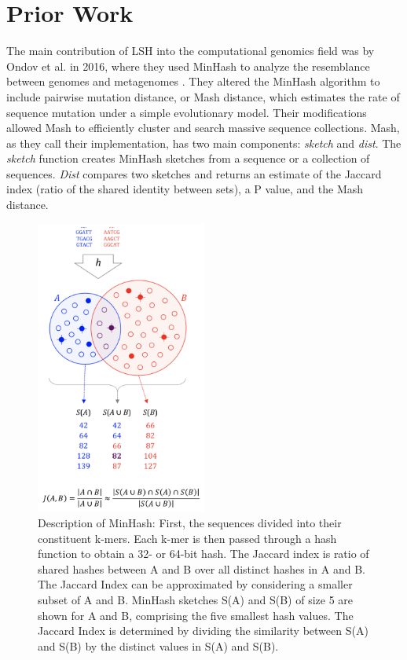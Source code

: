 \documentclass[12pt, letterpaper]{article}
\begin{document}
\section{Prior Work}
The main contribution of LSH into the computational genomics field was by Ondov et al. in 2016, where they used MinHash to analyze the resemblance between genomes and metagenomes \cite{MinHash}. They altered the MinHash algorithm to include pairwise mutation distance, or Mash distance, which estimates the rate of sequence mutation under a simple evolutionary model. Their modifications allowed Mash to efficiently cluster and search massive sequence collections. Mash, as they call their implementation, has two main components: \textit{sketch} and \textit{dist}. The \textit{sketch} function creates MinHash sketches from a sequence or a collection of sequences. \textit{Dist} compares two sketches and returns an estimate of the Jaccard index (ratio of the shared identity between sets), a P value, and the Mash distance.
\FloatBarrier
\begin{figure}[h!]
	\centering
	\includegraphics[width=0.5\textwidth]{Mash_description.png}
	\caption{Description of MinHash: First, the sequences divided into their constituent k-mers. Each k-mer is then passed through a hash function to obtain a 32- or 64-bit hash. The Jaccard index is ratio of shared hashes between A and B over all distinct hashes in A and B. The Jaccard Index can be approximated by considering a smaller subset of A and B. MinHash sketches S(A) and S(B) of size 5 are shown for A and B, comprising the five smallest hash values. The Jaccard Index is determined by dividing the similarity between S(A) and S(B) by the distinct values in S(A) and S(B).}
\end{figure}
\end{document}
